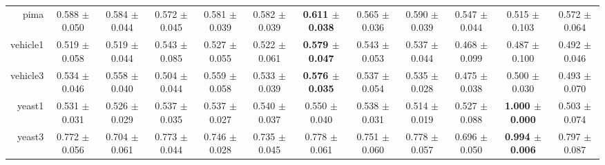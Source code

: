 \begin{table}[!ht]
{\begin{tabular}{r c c c c c c c c c c c}
pima & 0.588 $\pm$ 0.050 & 0.584 $\pm$ 0.044 & 0.572 $\pm$ 0.045 & 0.581 $\pm$ 0.039 & 0.582 $\pm$ 0.039 & \textbf{0.611 $\pm$ 0.038} & 0.565 $\pm$ 0.036 & 0.590 $\pm$ 0.039 & 0.547 $\pm$ 0.044 & 0.515 $\pm$ 0.103 & 0.572 $\pm$ 0.064 \\
vehicle1 & 0.519 $\pm$ 0.058 & 0.519 $\pm$ 0.044 & 0.543 $\pm$ 0.085 & 0.527 $\pm$ 0.055 & 0.522 $\pm$ 0.061 & \textbf{0.579 $\pm$ 0.047} & 0.543 $\pm$ 0.053 & 0.537 $\pm$ 0.044 & 0.468 $\pm$ 0.099 & 0.487 $\pm$ 0.100 & 0.492 $\pm$ 0.046 \\
vehicle3 & 0.534 $\pm$ 0.046 & 0.558 $\pm$ 0.040 & 0.504 $\pm$ 0.044 & 0.559 $\pm$ 0.058 & 0.533 $\pm$ 0.039 & \textbf{0.576 $\pm$ 0.035} & 0.537 $\pm$ 0.054 & 0.535 $\pm$ 0.028 & 0.475 $\pm$ 0.038 & 0.500 $\pm$ 0.030 & 0.493 $\pm$ 0.070 \\
yeast1 & 0.531 $\pm$ 0.031 & 0.526 $\pm$ 0.029 & 0.537 $\pm$ 0.035 & 0.537 $\pm$ 0.027 & 0.540 $\pm$ 0.037 & 0.550 $\pm$ 0.040 & 0.538 $\pm$ 0.031 & 0.514 $\pm$ 0.019 & 0.527 $\pm$ 0.088 & \textbf{1.000 $\pm$ 0.000} & 0.503 $\pm$ 0.074 \\
yeast3 & 0.772 $\pm$ 0.056 & 0.704 $\pm$ 0.061 & 0.773 $\pm$ 0.044 & 0.746 $\pm$ 0.028 & 0.735 $\pm$ 0.045 & 0.778 $\pm$ 0.061 & 0.751 $\pm$ 0.060 & 0.778 $\pm$ 0.057 & 0.696 $\pm$ 0.050 & \textbf{0.994 $\pm$ 0.006} & 0.797 $\pm$ 0.087 \\
\end{tabular}}
\end{table}
